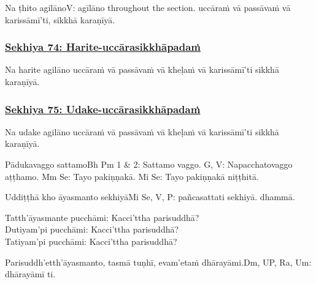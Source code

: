 Na ṭhito agilāno\makeatletter\hyperlink{endnote-appendix}\makeatother V: agīlāno throughout the section. uccāraṁ vā passāvaṁ vā karissāmī'ti, sikkhā karaṇīyā.



\subsubsection*{\hyperref[training74]{Sekhiya 74: Harite-uccārasikkhāpadaṁ}}
\label{sekh74}

Na harite agilāno uccāraṁ vā passāvaṁ vā kheḷaṁ vā karissāmī'ti sikkhā karaṇīyā.



\subsubsection*{\hyperref[training75]{Sekhiya 75: Udake-uccārasikkhāpadaṁ}}
\label{sekh75}

Na udake agilāno uccāraṁ vā passāvaṁ vā kheḷaṁ vā karissāmī'ti sikkhā karaṇīyā.

\begin{center}
	Pādukavaggo sattamo\makeatletter\hyperlink{endnote-appendix}\makeatother Bh Pm 1 & 2: Sattamo vaggo. G, V: Napacchatovaggo aṭṭhamo. Mm Se: Tayo pakiṇṇakā. Mi Se: Tayo pakiṇṇakā niṭṭhitā.
\end{center}



\medskip

\begin{center}
	Uddiṭṭhā kho āyasmanto sekhiyā\makeatletter\hyperlink{endnote-appendix}\makeatother Mi Se, V, P: pañcasattati sekhiyā. dhammā.

	\smallskip

	Tatth'āyasmante pucchāmi: Kacci'ttha parisuddhā?\\
	Dutiyam'pi pucchāmi: Kacci'ttha parisuddhā?\\
	Tatiyam'pi pucchāmi: Kacci'ttha parisuddhā?

	\smallskip

	Parisuddh'etth'āyasmanto, tasmā tuṇhī, evam'etaṁ dhārayāmi.\makeatletter\hyperlink{endnote-appendix}\makeatother Dm, UP, Ra, Um: dhārayāmī ti.
\end{center}

